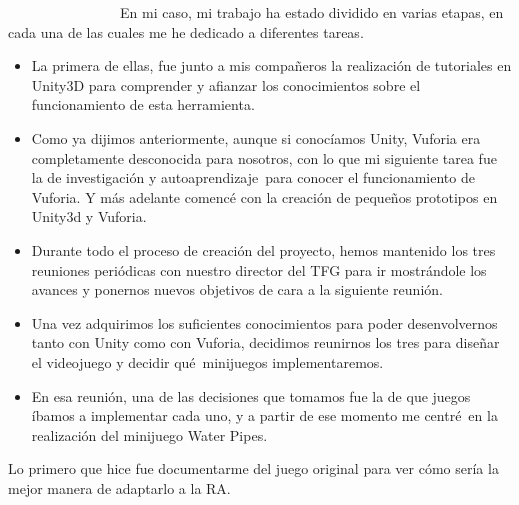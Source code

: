 \documentclass[]{article}
\begin{document}
~~~~~~~~~~~~~~~~En mi caso, mi trabajo ha estado dividido en varias
etapas, en cada una de las cuales me he dedicado a diferentes tareas.

\begin{itemize}
\itemsep1pt\parskip0pt
\item
  La primera de ellas, fue junto a mis compañeros la realización de
  tutoriales en Unity3D para comprender y afianzar los conocimientos
  sobre el funcionamiento de esta herramienta.
\end{itemize}

\begin{itemize}
\itemsep1pt\parskip0pt
\item
  Como ya dijimos anteriormente, aunque si conocíamos Unity, Vuforia era
  completamente desconocida para nosotros, con lo que mi siguiente tarea
  fue la de investigación y autoaprendizaje~para conocer el
  funcionamiento de Vuforia. Y más adelante comencé con la creación de
  pequeños prototipos en Unity3d y Vuforia.
\end{itemize}

\begin{itemize}
\itemsep1pt\parskip0pt
\item
  Durante todo el proceso de creación del proyecto, hemos mantenido los
  tres reuniones periódicas con nuestro director del TFG para ir
  mostrándole los avances y ponernos nuevos objetivos de cara a la
  siguiente reunión.
\end{itemize}

\begin{itemize}
\itemsep1pt\parskip0pt
\item
  Una vez adquirimos los suficientes conocimientos para poder
  desenvolvernos tanto con Unity como con Vuforia, decidimos reunirnos
  los tres para diseñar el videojuego y decidir qué~minijuegos
  implementaremos.
\end{itemize}

\begin{itemize}
\itemsep1pt\parskip0pt
\item
  En esa reunión, una de las decisiones que tomamos fue la de que juegos
  íbamos a implementar cada uno, y a partir de ese momento me centré~en
  la realización del minijuego Water Pipes.
\end{itemize}

Lo primero que hice fue documentarme del juego original para ver cómo
sería la mejor manera de adaptarlo a la RA.
\end{document}
